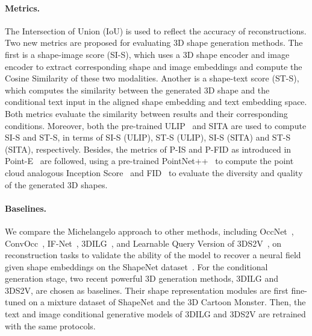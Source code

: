 \documentclass[../../book-main.tex]{subfiles}
\begin{document}
\paragraph{Metrics.}
The Intersection of Union (IoU) is used to reflect the accuracy of
reconstructions.
Two new metrics are proposed for evaluating 3D shape
generation methods.
The first is a shape-image score (SI-S), which
uses a 3D shape encoder and image encoder to extract corresponding
shape and image embeddings and compute the Cosine Similarity of these
two modalities.
Another is a shape-text score (ST-S), which computes
the similarity between the generated 3D shape and the conditional
text input in the aligned shape embedding and text embedding space.
Both metrics evaluate the similarity between results and their
corresponding conditions.
Moreover, both the pre-trained
ULIP~\citep{10203465} and SITA are used to compute SI-S and ST-S, in
terms of SI-S (ULIP), ST-S (ULIP), SI-S (SITA) and ST-S (SITA),
respectively.
Besides, the metrics of P-IS and P-FID as introduced in
Point-E~\citep{nichol2022point} are followed, using a pre-trained
PointNet++~\citep{NIPS2017_d8bf84be} to compute the point cloud
analogous Inception Score~\citep{NIPS2016_8a3363ab} and
FID~\citep{NIPS2017_8a1d6947} to evaluate the diversity and quality of
the generated 3D shapes.

\paragraph{Baselines.}
We compare the Michelangelo approach to other methods, including
OccNet~\citep{8953655}, ConvOcc~\citep{10.1007/978-3-030-58580-8_31},
IF-Net~\citep{9156292}, 3DILG~\citep{NEURIPS2022_894ca1c4}, and
Learnable Query Version of 3DS2V~\citep{10.1145/3592442}, on
reconstruction tasks to validate the ability of the model to recover
a neural field given shape embeddings on the ShapeNet
dataset~\citep{chang2015shapenet}.
For the conditional generation
stage, two recent powerful 3D generation methods, 3DILG and 3DS2V,
are chosen as baselines.
Their shape representation modules are first
fine-tuned on a mixture dataset of ShapeNet and the 3D Cartoon
Monster.
Then, the text and image conditional generative models of
3DILG and 3DS2V are retrained with the same protocols.
\end{document}
